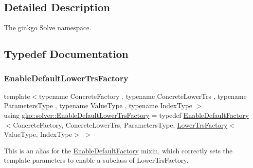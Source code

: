 \subsection{Detailed Description}
The ginkgo Solve namespace. 

\subsection{Typedef Documentation}
\mbox{\label{namespacegko_1_1solver_a6ff1e5ae2e801957e4055be113328f67}} 
\subsubsection{\texorpdfstring{Enable\+Default\+Lower\+Trs\+Factory}{EnableDefaultLowerTrsFactory}}
{\footnotesize\ttfamily template$<$typename Concrete\+Factory , typename Concrete\+Lower\+Trs , typename Parameters\+Type , typename Value\+Type , typename Index\+Type $>$ \\
using \hyperlink{namespacegko_1_1solver_a6ff1e5ae2e801957e4055be113328f67}{gko\+::solver\+::\+Enable\+Default\+Lower\+Trs\+Factory} = typedef \hyperlink{classgko_1_1EnableDefaultFactory}{Enable\+Default\+Factory}$<$Concrete\+Factory, Concrete\+Lower\+Trs, Parameters\+Type, \hyperlink{namespacegko_1_1solver_a33146299540a54a9a39ec127fc8c6c1a}{Lower\+Trs\+Factory}$<$Value\+Type, Index\+Type$>$ $>$}



This is an alias for the \hyperlink{classgko_1_1EnableDefaultFactory}{Enable\+Default\+Factory} mixin, which correctly sets the template parameters to enable a subclass of Lower\+Trs\+Factory. 


